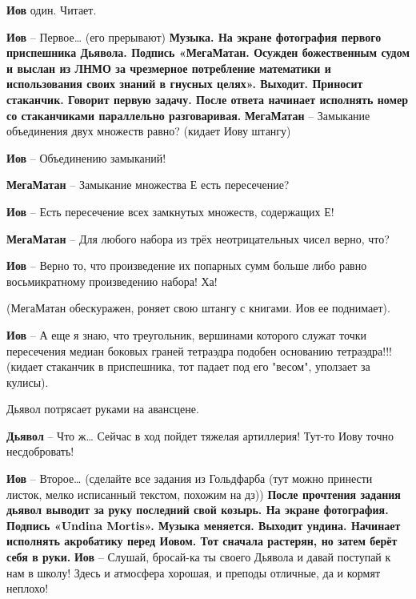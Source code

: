 \documentclass[10pt,a4paper]{article}
\begin{document}
\textbf{Иов} один. Читает. 

\textbf{Иов} -- Первое… (его прерывают)
\newline\newline
\textbf{Музыка. На экране фотография первого приспешника Дьявола. Подпись «МегаМатан. Осужден божественным судом и выслан из ЛНМО за чрезмерное потребление математики и использования своих знаний в гнусных целях».
Выходит. Приносит стаканчик. Говорит первую задачу. После ответа начинает исполнять номер со стаканчиками параллельно разговаривая.}
\newline\newline
\textbf{МегаМатан} -- Замыкание объединения двух множеств равно? (кидает Иову штангу)

\textbf{Иов} -- Объединению замыканий!

\textbf{МегаМатан} -- Замыкание множества Е есть пересечение?

\textbf{Иов} -- Есть пересечение всех замкнутых множеств, содержащих Е!

\textbf{МегаМатан} -- Для любого набора из трёх неотрицательных чисел верно, что?

\textbf{Иов} -- Верно то, что произведение их попарных сумм больше либо равно восьмикратному произведению набора! Ха!

(МегаМатан обескуражен, роняет свою штангу с книгами. Иов ее поднимает).

\textbf{Иов} -- А еще я знаю, что треугольник, вершинами которого служат точки пересечения медиан боковых граней тетраэдра подобен основанию тетраэдра!!! (кидает стаканчик в приспешника, тот падает под его "весом", уползает за кулисы).

Дьявол потрясает руками на авансцене.

\textbf{Дьявол} -- Что ж… Сейчас в ход пойдет тяжелая артиллерия! Тут-то Иову точно несдобровать!

\textbf{Иов} -- Второе… (сделайте все задания из Гольдфарба (тут можно принести листок, мелко исписанный текстом, похожим на дз))
\newline\newline
\textbf{После прочтения задания дьявол выводит за руку последний свой козырь. На экране фотография. Подпись 
«Undina Mortis». 
Музыка меняется. Выходит ундина. 
Начинает исполнять акробатику перед Иовом. Тот сначала растерян, но затем берёт себя в руки.}
\newline\newline
\textbf{Иов} -- Слушай, бросай-ка ты своего Дьявола и давай поступай к нам в школу! Здесь и атмосфера хорошая, и преподы отличные, да и кормят неплохо!
\end{document}
